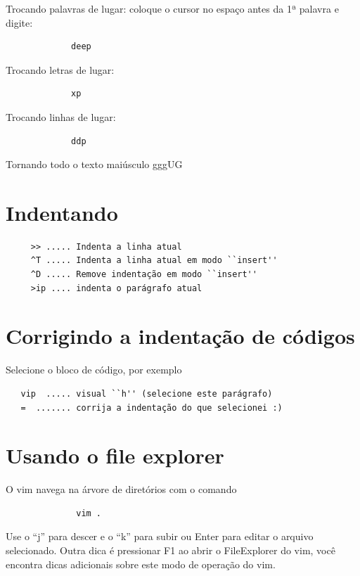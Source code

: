 \documentclass[10pt,a4paper,openany]{book}
\begin{document}
Trocando palavras de lugar: coloque o cursor no espaço antes da 1ª palavra e digite:

\begin{verbatim}
			 deep
\end{verbatim}

Trocando letras de lugar:

\begin{verbatim}
			 xp
\end{verbatim}

Trocando linhas de lugar:

\begin{verbatim}
			 ddp
\end{verbatim}

Tornando todo o texto maiúsculo
 gggUG

\section{Indentando }

\begin{verbatim}
	 >> ..... Indenta a linha atual
	 ^T ..... Indenta a linha atual em modo ``insert''
	 ^D ..... Remove indentação em modo ``insert''
	 >ip .... indenta o parágrafo atual
\end{verbatim}

\section{Corrigindo a indentação de códigos}
\label{Corrigindo a indentação de códigos}
Selecione o bloco de código, por exemplo

\begin{verbatim}
   vip  ..... visual ``h'' (selecione este parágrafo)
   =  ....... corrija a indentação do que selecionei :)
\end{verbatim}

\section{Usando o file explorer}
\label{Usando o file explorer}
O vim navega na árvore de diretórios com o comando

\begin{verbatim}
			  vim .
\end{verbatim}

Use o ``j'' para descer e o ``k'' para subir ou Enter para editar o
arquivo selecionado. Outra dica é pressionar F1 ao abrir o
FileExplorer do vim, você encontra dicas adicionais sobre este modo de
operação do vim.
\end{document}
